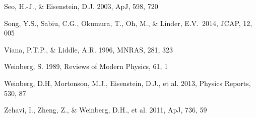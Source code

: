 \documentclass[iop]{emulateapj}
\begin{document}
\begin{thebibliography}{}





Seo, H.-J., \& Eisenstein, D.J. 2003, ApJ, 598, 720



Song, Y.S., Sabiu, C.G., 
Okumura, T., Oh, M., \& Linder, E.V.\ 2014, JCAP, 12, 005 




Viana, P.T.P., \& Liddle, A.R. 1996, MNRAS, 281, 323



Weinberg, S. 1989, Reviews of Modern Physics, 61, 1

Weinberg, D.H, Mortonson, M.J., Eisenstein, D.J., et al. 2013, Physics Reports, 530, 87




Zehavi, I., Zheng, Z., \& Weinberg, D.H., et al. 2011, ApJ, 736, 59




\end{thebibliography}
\end{document}

